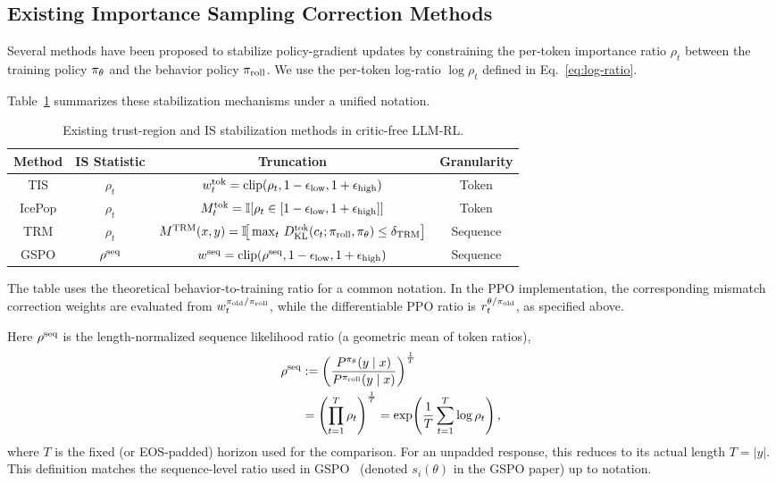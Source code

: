 \subsection{Existing Importance Sampling Correction Methods}
\label{sec:existing-is}

Several methods have been proposed to stabilize policy-gradient updates by constraining the per-token importance ratio $\rho_t$ between the
training policy $\pi_{\theta}$ and the behavior policy $\pi_{\mathrm{roll}}$. We use the per-token log-ratio $\log\rho_t$ defined in
Eq.~\eqref{eq:log-ratio}.

\noindent Table~\ref{tab:is-methods} summarizes these stabilization mechanisms under a unified notation.
\begin{table}[ht]
\centering
\small
\caption{Existing trust-region and IS stabilization methods in critic-free LLM-RL.}
\label{tab:is-methods}
\renewcommand{\arraystretch}{1.2}
\setlength{\tabcolsep}{4pt}
\begin{tabular}{cccc}
\toprule
\textbf{Method} & \textbf{IS Statistic} & \textbf{Truncation} & \textbf{Granularity} \\
\midrule
TIS & $\rho_t$ & $w_t^{\mathrm{tok}}=\mathrm{clip}(\rho_t,1-\epsilon_{\mathrm{low}},1+\epsilon_{\mathrm{high}})$ & Token \\
IcePop & $\rho_t$ & $M_t^{\mathrm{tok}}=\mathbb{I}[\rho_t \in [1-\epsilon_{\mathrm{low}},1+\epsilon_{\mathrm{high}}]]$ & Token \\
TRM & $\rho_t$ & $M^{\mathrm{TRM}}(x,y)=\mathbb{I}\!\big[\max_t\,D_{\mathrm{KL}}^{\mathrm{tok}}(c_t;\pi_{\mathrm{roll}},\pi_{\theta})\le \delta_{\mathrm{TRM}}\big]$ & Sequence \\
GSPO & $\rho^{\mathrm{seq}}$ & $w^{\mathrm{seq}}=\mathrm{clip}(\rho^{\mathrm{seq}},1-\epsilon_{\mathrm{low}},1+\epsilon_{\mathrm{high}})$ & Sequence \\
\bottomrule
\end{tabular}
\end{table}

The table uses the theoretical behavior-to-training ratio for a common
notation. In the PPO implementation, the corresponding mismatch correction
weights are evaluated from $w_t^{\pi_{\mathrm{old}}/\pi_{\mathrm{roll}}}$, while the differentiable
PPO ratio is $r_t^{\theta/\pi_{\mathrm{old}}}$, as specified above.

\noindent Here $\rho^{\mathrm{seq}}$ is the length-normalized sequence likelihood ratio (a geometric mean of token ratios),
\begin{equation*}
    \begin{aligned}
        \rho^{\mathrm{seq}}
        &:= \left(\frac{P^{\pi_{\theta}}(y \mid x)}{P^{\pi_{\mathrm{roll}}}(y \mid x)}\right)^{\frac{1}{T}}
        \\
        &= \left(\prod_{t=1}^{T}\rho_t\right)^{\frac{1}{T}}
        = \exp\!\left(\frac{1}{T}\sum_{t=1}^{T}\log\rho_t\right),
    \end{aligned}
\end{equation*}
where $T$ is the fixed (or EOS-padded) horizon used for the comparison. For an unpadded response, this reduces to its actual length
$T=|y|$. This definition matches the sequence-level ratio used in GSPO~\citep{gspo2025} (denoted $s_i(\theta)$ in the GSPO paper) up to
notation.

